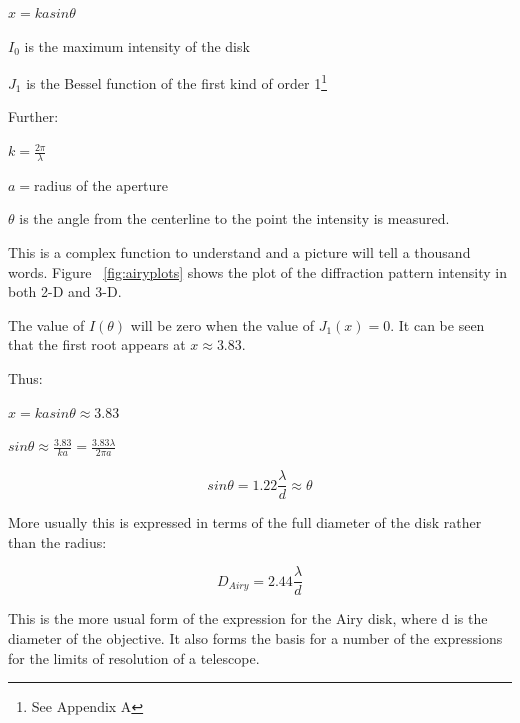 \documentclass[11pt]{article}
\begin{document}
\Large
$x = kasin\theta$

$I_{0}$ \large is the maximum intensity of the disk 
\Large

$J_{1}$ \large is the Bessel function of the first kind of order 1\footnote{See Appendix A}


Further:

\Large
$k=\frac{2\pi}{\lambda}$

$a=$\large radius of the aperture

$\theta$ is the angle from the centerline to the point the intensity is measured.

This is a complex function to understand and a picture will tell a thousand words. Figure ~\ref{fig:airyplots} shows the plot of the diffraction pattern intensity in both 2-D and 3-D.

The value of $I(\theta)$ will be zero when the value of $J_{1}(x) = 0$.  It can be seen that the first root appears at $x\approx3.83$.

Thus:

\large
$x = kasin\theta \approx 3.83$

$sin\theta\approx\frac{3.83}{ka}=\frac{3.83\lambda}{2\pi a}$

\begin{equation}
\label{eqn:airy-radius}
sin\theta = 1.22\frac{\lambda}{d} \approx \theta 
\end{equation}

More usually this is expressed in terms of the full diameter of the disk rather than the radius:

\begin{equation}
\label{eqn:airy-diameter}
D_{Airy} = 2.44\frac{\lambda}{d}
\end{equation}

\large
This is the more usual form of the expression for the Airy disk, where d is the diameter of the objective.  It also forms the basis for a number of the expressions for the limits of resolution of a telescope.
\end{document}
